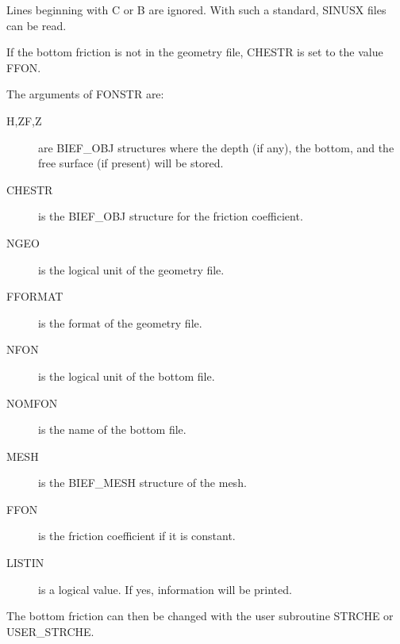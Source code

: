 Lines beginning with C or B are ignored. With such a standard, SINUSX files can
be read.

If the bottom friction is not in the geometry file, CHESTR is set to the value
FFON.

The arguments of FONSTR are:
\begin{description}
  \item [H,ZF,Z] are BIEF\_OBJ structures where the depth (if any), the bottom,
    and the free surface (if present) will be stored.
  \item [CHESTR] is the BIEF\_OBJ structure for the friction coefficient.
  \item [NGEO] is the logical unit of the geometry file.
  \item [FFORMAT] is the format of the geometry file.
  \item [NFON] is the logical unit of the bottom file.
  \item [NOMFON] is the name of the bottom file.
  \item [MESH] is the BIEF\_MESH structure of the mesh.
  \item [FFON] is the friction coefficient if it is constant.
  \item [LISTIN] is a logical value. If yes, information will be printed.
\end{description}

The bottom friction can then be changed with the user subroutine STRCHE
or USER\_STRCHE.

